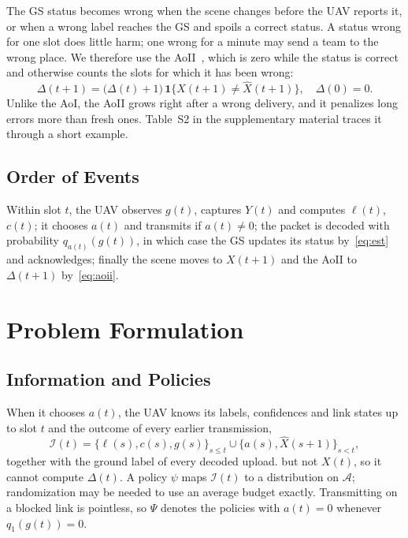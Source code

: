 \documentclass[10pt,journal,compsoc]{IEEEtran}
\theoremstyle{remark}
\newcommand{\ind}[1]{\mathbf{1}\{#1\}}
\newcommand{\A}{\mathcal{A}}
\newcommand{\I}{\mathcal{I}}
\newcommand{\lab}{\ell}
\begin{document}
The GS status becomes wrong when the scene changes before the UAV reports it, or when a wrong label reaches the GS and spoils a correct status. A status wrong for one slot does little harm; one wrong for a minute may send a team to the wrong place. We therefore use the AoII~\cite{maatouk2020aoii}, which is zero while the status is correct and otherwise counts the slots for which it has been wrong:
\begin{equation}\label{eq:aoii}
\Delta(t+1)=\big(\Delta(t)+1\big)\,\ind{X(t+1)\neq\hat X(t+1)},\quad \Delta(0)=0.
\end{equation}
Unlike the AoI, the AoII grows right after a wrong delivery, and it penalizes long errors more than fresh ones. Table~S2 in the supplementary material traces it through a short example.




\subsection{Order of Events}\label{sec:events}
Within slot $t$, the UAV observes $g(t)$, captures $Y(t)$ and computes $\lab(t)$, $c(t)$; it chooses $a(t)$ and transmits if $a(t)\neq0$; the packet is decoded with probability $q_{a(t)}(g(t))$, in which case the GS updates its status by~\eqref{eq:est} and acknowledges; finally the scene moves to $X(t+1)$ and the AoII to $\Delta(t+1)$ by~\eqref{eq:aoii}.
\section{Problem Formulation}\label{sec:problem}

\subsection{Information and Policies}
When it chooses $a(t)$, the UAV knows its labels, confidences and link states up to slot $t$ and the outcome of every earlier transmission,
\begin{equation}\label{eq:info}
\I(t)=\big\{\lab(s),c(s),g(s)\big\}_{s\le t}\cup\big\{a(s),\hat X(s+1)\big\}_{s<t},
\end{equation}
together with the ground label of every decoded upload.
but not $X(t)$, so it cannot compute $\Delta(t)$. A policy $\psi$ maps $\I(t)$ to a distribution on $\A$; randomization may be needed to use an average budget exactly. Transmitting on a blocked link is pointless, so $\Psi$ denotes the policies with $a(t)=0$ whenever $q_1(g(t))=0$.
\end{document}
